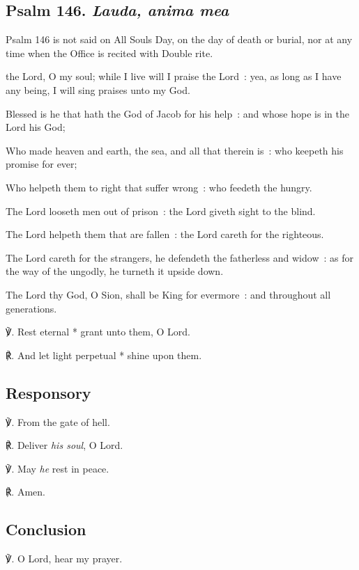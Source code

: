 \subsection{Psalm 146. \textit{Lauda, anima mea}}
\begin{rubric}
{Psalm 146 is not said on All Souls Day, on the day of death or burial, nor at any time when the Office is recited with Double rite.}
\end{rubric}
 the Lord, O my soul; while I live will I praise the Lord~: yea, as long as I have any being, I will sing praises unto my God.\par
{}
Blessed is he that hath the God of Jacob for his help~: and whose hope is in the Lord his God;\par
{}Who made heaven and earth, the sea, and all that therein is~: who keepeth his promise for ever;\par
{}Who helpeth them to right that suffer wrong~: who feedeth the hungry.\par
{}The Lord looseth men out of prison~: the Lord giveth sight to the blind.\par
{}The Lord helpeth them that are fallen~: the Lord careth for the righteous.\par
{}The Lord careth for the strangers, he defendeth the fatherless and widow~: as for the way of the ungodly, he turneth it upside down.\par
{}The Lord thy God, O Sion, shall be King for evermore~: and throughout all generations.
\par
℣. Rest eternal * grant unto them, O Lord.\par
℟. And let light perpetual * shine upon them.

\subsection{Responsory}
℣. From the gate of hell.

℟. Deliver \textit{his soul}, O Lord.

℣. May \textit{he} rest in peace.

℟. Amen.

\subsection{Conclusion}
℣. O Lord, hear my prayer.

